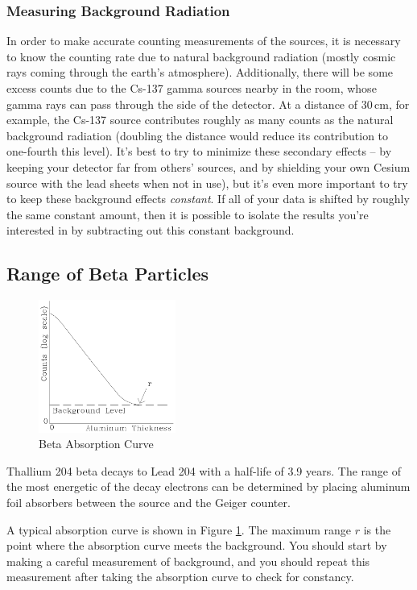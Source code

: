 \subsubsection{Measuring Background Radiation}

In order to make accurate counting measurements of the sources, it is necessary to know the counting rate due to natural background radiation (mostly cosmic rays coming through the earth's atmosphere). Additionally, there will be some excess counts due to the Cs-137 gamma sources nearby in the room, whose gamma rays can pass through the side of the detector. At a distance of $30\,\mathrm{cm}$, for example, the Cs-137 source contributes roughly as many counts as the natural background radiation (doubling the distance would reduce its contribution to one-fourth this level). It's best to try to minimize these secondary effects -- by keeping your detector far from others' sources, and by shielding your own Cesium source with the lead sheets when not in use), but it's even more important to try to keep these background effects \emph{constant}. If all of your data is shifted by roughly the same constant amount, then it is possible to isolate the results you're interested in by subtracting out this constant background.

\subsection{Range of Beta Particles}
\begin{figure}[h]
\centering
\includegraphics[width=0.4\textwidth]{./Exp10/pic/image7.png}
\caption{Beta Absorption Curve}
\label{fig:beta}
\end{figure}
Thallium 204 beta decays to Lead 204 with a half-life of 3.9 years. The range of the most energetic of the decay electrons can be determined by placing aluminum foil absorbers between the source and the Geiger counter.\myskip

A typical absorption curve is shown in Figure {\ref{fig:beta}}. The maximum range $r$ is the point where the absorption curve meets the background. You should start by making a careful measurement of background, and you should repeat this measurement after taking the absorption curve to check for constancy.\myskip

